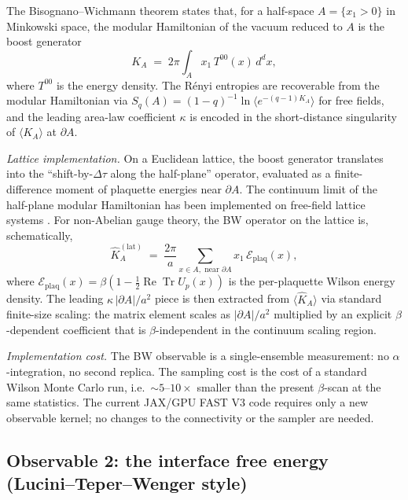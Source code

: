 \documentclass[11pt,a4paper]{article}
\theoremstyle{definition}
\newcommand{\Tr}{\operatorname{Tr}}
\renewcommand{\Re}{\operatorname{Re}}
\newcommand{\half}{\tfrac{1}{2}}
\begin{document}
The Bisognano--Wichmann theorem \cite{BisognanoWichmann1976} states
that, for a half-space $A = \{x_{1} > 0\}$ in Minkowski space, the
modular Hamiltonian of the vacuum reduced to $A$ is the boost
generator
\begin{equation}
   K_{A} \;=\; 2\pi \!\!\!\int_{A}\!\! x_{1}\,T^{00}(x)\,d^{d}x,
   \label{eq:BW}
\end{equation}
where $T^{00}$ is the energy density. The Rényi entropies are
recoverable from the modular Hamiltonian via
$S_{q}(A) = (1-q)^{-1}\ln\langle e^{-(q-1)K_{A}}\rangle$ for free
fields, and the leading area-law coefficient $\kappa$ is encoded in
the short-distance singularity of $\langle K_{A}\rangle$ at
$\partial A$.

\medskip
\noindent\emph{Lattice implementation.}
On a Euclidean lattice, the boost generator translates into the
``shift-by-$\Delta\tau$ along the half-plane'' operator, evaluated as
a finite-difference moment of plaquette energies near $\partial A$.
The continuum limit of the half-plane modular Hamiltonian has been
implemented on free-field lattice systems
\cite{CasiniHuerta2009,CasiniHuerta2011-MH}. For non-Abelian gauge
theory, the BW operator on the lattice is, schematically,
\begin{equation}
   \widehat K_{A}^{(\mathrm{lat})} \;=\;
   \frac{2\pi}{a}\!\!\sum_{x\in A, \text{ near }\partial A}\!\!
        x_{1}\,\mathcal{E}_{\mathrm{plaq}}(x),
   \label{eq:K-lat}
\end{equation}
where $\mathcal{E}_{\mathrm{plaq}}(x) = \beta(1 - \half\Re\Tr U_{p}(x))$
is the per-plaquette Wilson energy density. The leading
$\kappa\,|\partial A|/a^{2}$ piece is then extracted from
$\langle \widehat K_{A}\rangle$ via standard finite-size scaling:
the matrix element scales as $|\partial A|/a^{2}$ multiplied by an
explicit $\beta$-dependent coefficient that is $\beta$-independent
in the continuum scaling region.

\emph{Implementation cost.} The BW observable is a single-ensemble
measurement: no $\alpha$-integration, no second replica. The
sampling cost is the cost of a standard Wilson Monte Carlo run, i.e.\
$\sim\!5$--$10\times$ smaller than the present $\beta$-scan at the
same statistics. The current JAX/GPU FAST V3 code requires only a
new observable kernel; no changes to the connectivity or the
sampler are needed.

\subsection{Observable 2: the interface free energy
(Lucini--Teper--Wenger style)}
\label{sec:interface}
\end{document}
